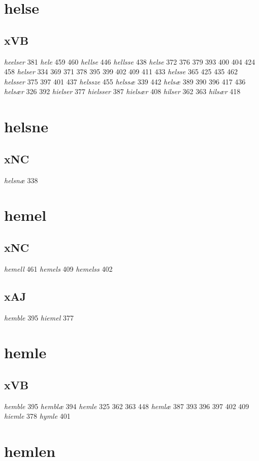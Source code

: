 \documentclass[a4paper,twocolumn]{article}
\begin{document}
\section{helse}
\label{sec:orge45ec26}
\subsection{xVB}
\label{sec:orgb55451a}
\emph{heelser} 381 \emph{hele} 459 460 \emph{hellse} 446 \emph{hellsse} 438 \emph{helse} 372 376 379 393 400 404 424 458 \emph{helser} 334 369 371 378 395 399 402 409 411 433 \emph{helsse} 365 425 435 462 \emph{helsser} 375 397 401 437 \emph{helssze} 455 \emph{helssæ} 339 442 \emph{helsæ} 389 390 396 417 436 \emph{helsær} 326 392 \emph{hielser} 377 \emph{hielsser} 387 \emph{hielsær} 408 \emph{hilser} 362 363 \emph{hilsær} 418 
\section{helsne}
\label{sec:orge5ed2d1}
\subsection{xNC}
\label{sec:org7f10075}
\emph{helsnæ} 338 
\section{hemel}
\label{sec:org72ccb05}
\subsection{xNC}
\label{sec:orgdcb381f}
\emph{hemell} 461 \emph{hemels} 409 \emph{hemelss} 402 
\subsection{xAJ}
\label{sec:org899f984}
\emph{hemble} 395 \emph{hiemel} 377 
\section{hemle}
\label{sec:orgacfc51e}
\subsection{xVB}
\label{sec:org56ac442}
\emph{hemble} 395 \emph{hemblæ} 394 \emph{hemle} 325 362 363 448 \emph{hemlæ} 387 393 396 397 402 409 \emph{hiemle} 378 \emph{hymle} 401 
\section{hemlen}
\label{sec:orga37e3c1}
\end{document}
